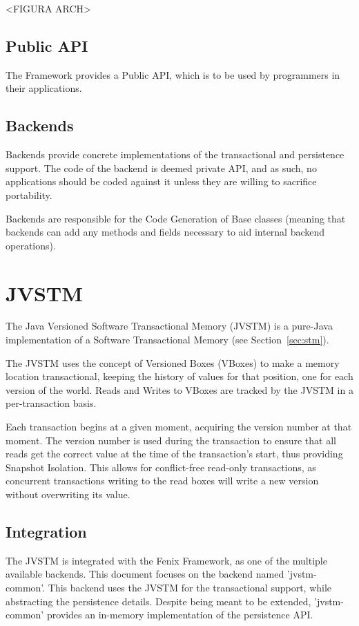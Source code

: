 <FIGURA ARCH>

\subsection{Public API}

The Framework provides a Public API, which is to be used by
programmers in their applications.

\subsection{Backends}

Backends provide concrete implementations of the transactional and
persistence support. The code of the backend is deemed private API,
and as such, no applications should be coded against it unless they
are willing to sacrifice portability.

Backends are responsible for the Code Generation of Base classes
(meaning that backends can add any methods and fields necessary to aid
internal backend operations).

\section{JVSTM}
\label{sec:jvstm}

The Java Versioned Software Transactional Memory (JVSTM)
\cite{cachopo2006versioned} is a pure-Java implementation of a
Software Transactional Memory (see Section~\ref{sec:stm}).

The JVSTM uses the concept of Versioned Boxes (VBoxes) to make a
memory location transactional, keeping the history of values for that
position, one for each version of the world. Reads and Writes to
VBoxes are tracked by the JVSTM in a per-transaction basis. 

Each transaction begins at a given moment, acquiring the version
number at that moment. The version number is used during the
transaction to ensure that all reads get the correct value at the time
of the transaction's start, thus providing Snapshot Isolation. This
allows for conflict-free read-only transactions, as concurrent
transactions writing to the read boxes will write a new version
without overwriting its value.

\subsection{Integration}

The JVSTM is integrated with the Fenix Framework, as one of the
multiple available backends. This document focuses on the backend
named 'jvstm-common'. This backend uses the JVSTM for the
transactional support, while abstracting the persistence
details. Despite being meant to be extended, 'jvstm-common' provides
an in-memory implementation of the persistence API.

